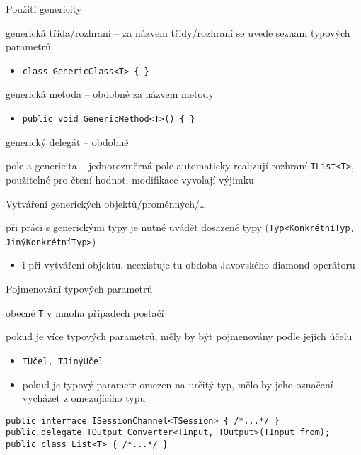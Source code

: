 \begin{frame}[fragile]
\vfill
\begin{bitemize}{Použití genericity}
\item generická třída/rozhraní -- za názvem třídy/rozhraní se uvede seznam typových parametrů
\begin{itemize}
\item \lstinline|class GenericClass<T> { }|
\end{itemize}

\item generická metoda -- obdobně za názvem metody
\begin{itemize}
\item \lstinline|public void GenericMethod<T>() { }|
\end{itemize}

\item generický delegát -- obdobně
\item pole a genericita -- jednorozměrná pole automaticky realizují rozhraní \lstinline|IList<T>|, použitelné pro čtení hodnot, modifikace vyvolají výjimku
\end{bitemize}
\vfill
\begin{bitemize}{Vytváření generických objektů/proměnných/\ldots}
\item při práci s generickými typy je nutné uvádět dosazené typy (\lstinline|Typ<KonkrétníTyp, JinýKonkrétníTyp>|)
\begin{itemize}
\item i při vytváření objektu, neexistuje tu obdoba Javovského diamond operátoru
\end{itemize}
\end{bitemize}
\vfill
\end{frame}


\begin{frame}[fragile]
\vfill
\begin{bitemize}{Pojmenování typových parametrů}
\item obecné \lstinline|T| v mnoha případech postačí
\item pokud je více typových parametrů, měly by být pojmenovány podle jejich účelu
\begin{itemize}
\item \lstinline|TÚčel, TJinýÚčel|
\item pokud je typový parametr omezen na určitý typ, mělo by jeho označení vycházet z omezujícího typu
\end{itemize}
\end{bitemize}
\vfill
\begin{yesblock}
\begin{lstlisting}
public interface ISessionChannel<TSession> { /*...*/ }
public delegate TOutput Converter<TInput, TOutput>(TInput from);
public class List<T> { /*...*/ }
\end{lstlisting}
\end{yesblock}
\vfill
\end{frame}



